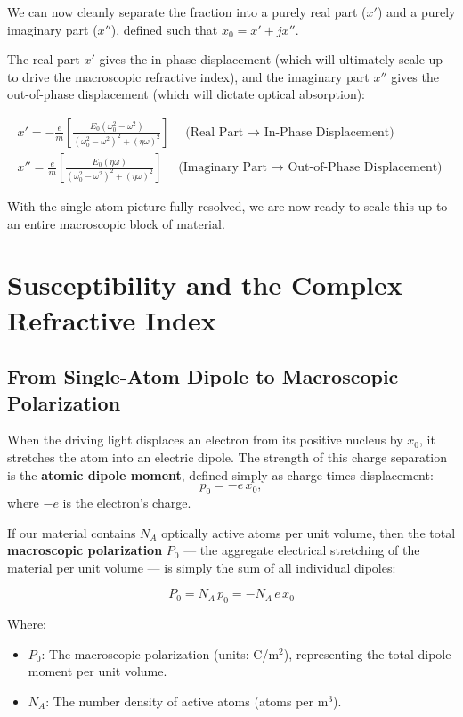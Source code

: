 We can now cleanly separate the fraction into a purely real part ($x'$) and a purely imaginary part ($x''$), defined such that $x_0 = x' + jx''$.

The real part $x'$ gives the in-phase displacement (which will ultimately scale up to drive the macroscopic refractive index), and the imaginary part $x''$ gives the out-of-phase displacement (which will dictate optical absorption):
\begin{keyresult}
    \begin{gather}
        x' = -\frac{e}{m} \left[ \frac{E_0(\omega_0^2 - \omega^2)}{(\omega_0^2 - \omega^2)^2 + (\eta\omega)^2} \right] \quad \text{(Real Part $\to$ In-Phase Displacement)} \\[1ex]
        x'' = \frac{e}{m} \left[ \frac{E_0(\eta\omega)}{(\omega_0^2 - \omega^2)^2 + (\eta\omega)^2} \right] \quad \text{(Imaginary Part $\to$ Out-of-Phase Displacement)}
    \end{gather}
\end{keyresult}

With the single-atom picture fully resolved, we are now ready to scale this up to an entire macroscopic block of material.

\section{Susceptibility and the Complex Refractive Index}

\subsection{From Single-Atom Dipole to Macroscopic Polarization}

When the driving light displaces an electron from its positive nucleus by $x_0$, it stretches the atom into an electric dipole. The strength of this charge separation is the \textbf{atomic dipole moment}, defined simply as charge times displacement:
\begin{equation*}
    p_0 = -e\,x_0,
\end{equation*}
where $-e$ is the electron's charge.

If our material contains $N_A$ optically active atoms per unit volume, then the total \textbf{macroscopic polarization} $P_0$ — the aggregate electrical stretching of the material per unit volume — is simply the sum of all individual dipoles:
\begin{keyresult}
    \begin{equation}
        P_0 = N_A\,p_0 = -N_A\,e\,x_0
    \end{equation}
\end{keyresult}
Where:
\begin{itemize}
    \item $P_0$: The macroscopic polarization (units: C/m$^2$), representing the total dipole moment per unit volume.
    \item $N_A$: The number density of active atoms (atoms per m$^3$).
\end{itemize}

